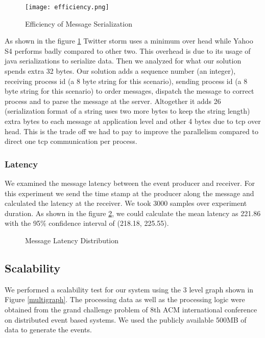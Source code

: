 \begin{figure}[!t]
        \centering
        \texttt{[image: efficiency.png]}

        \caption{Efficiency of Message Serialization}
        \label{efficiency}
\end{figure}

As shown in the figure \ref{efficiency} Twitter storm\cite{twitterStorm} uses a minimum over head while Yahoo S4\cite{neumeyer2010s4} performs badly compared to other two. This overhead is due to its usage of  java serializations to serialize data. Then we analyzed for what our solution spends extra 32 bytes. Our solution adds a sequence number (an integer), receiving process id (a 8 byte string for this scenario), sending process id (a 8 byte string for this scenario) to order messages, dispatch the message to correct process and to parse the message at the server. Altogether it adds 26 (serialization format of a string uses two more bytes to keep the string length) extra bytes to each message at application level and other 4 bytes due to tcp over head. This is the trade off we had to pay to improve the parallelism compared to direct one tcp communication per process. 

\subsubsection{Latency}
We examined the message latency between the event producer and receiver. For this experiment we send the time stamp at the producer along the message and calculated the latency at the receiver. We took 3000 samples over experiment duration. As shown in the figure \ref{latancydis}, we could calculate the mean latency as 221.86 with the 95\% confidence interval of (218.18, 225.55).

\begin{figure}[!t]
        \centering
        \hfil
        \caption{Message Latency Distribution}
        \label{latancydis}
\end{figure}


\subsection{Scalability}
We performed a scalability test for our system using the 3 level graph shown in Figure \ref{multigraph}. The processing data as well as the processing logic were obtained from the grand challenge problem of 8th ACM international conference on distributed event based systems. We used the publicly available 500MB of data to generate the events. 

